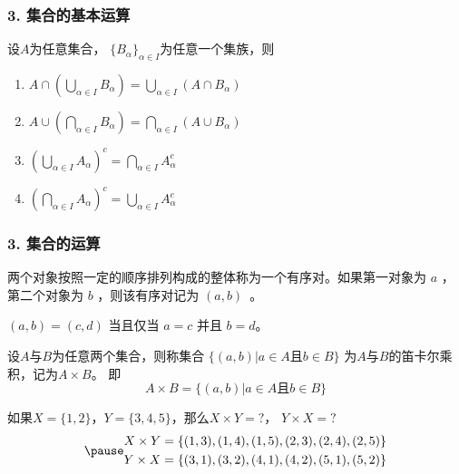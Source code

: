 \documentclass{beamer}
\begin{document}
\begin{CJK*}{UTF8}{gbsn}
\begin{frame}
  \frametitle{3. 集合的基本运算}
\begin{Thm}
设$A$为任意集合， $\{B_{\alpha}\}_{\alpha \in I}$为任意一个集族，则
\begin{enumerate}
\item $A \cap (\bigcup_{\alpha \in I}B_{\alpha}) = \bigcup_{\alpha \in I}(A \cap B_{\alpha})$
\item $A \cup (\bigcap_{\alpha \in I}B_{\alpha}) = \bigcap_{\alpha \in I}(A \cup B_{\alpha})$
\item $(\bigcup_{\alpha \in I}A_{\alpha})^c=\bigcap_{\alpha\in I}A_{\alpha}^c$
\item $(\bigcap_{\alpha \in I}A_{\alpha})^c=\bigcup_{\alpha\in I}A_{\alpha}^c$
\end{enumerate}
\end{Thm}
\end{frame}
\begin{frame}
  \frametitle{3. 集合的运算}
  \begin{Def}
    两个对象按照一定的顺序排列构成的整体称为一个\alert{有序对}。如果第一对象为 $a$ ，第二个对象为 $b$ ，则该有序对记为 $(a,b)$~。

    $(a,b)=(c,d)$ 当且仅当 $a=c$ 并且 $b=d$。
  \end{Def}\pause
  \begin{Def}
    设$A$与$B$为任意两个集合，则称集合 $\{(a,b)|a\in A \text{且} b \in B\}$ 为$A$与$B$的\alert{笛卡尔乘积}，记为$A \times B$。
即
\begin{equation*}
  A \times B = \{(a,b)|a \in A \text{且} b \in B\}
\end{equation*}
  \end{Def}\pause
\vspace{-0.5cm}
  \begin{Ex}
    如果$X=\{1,2\}$，$Y=\{3,4,5\}$，那么$X \times Y = ?$， $Y \times X = ?$
    \begin{equation*}
\pause
      \begin{split}
       X \times Y &= \{ (1,3), (1,4), (1,5), (2,3), (2,4), (2, 5) \}\\
       Y \times X &= \{(3,1), (3,2), (4,1), (4,2), (5,1), (5,2)\}
      \end{split}
    \end{equation*}
  \end{Ex}
\end{frame}


\end{CJK*}
\end{document}

